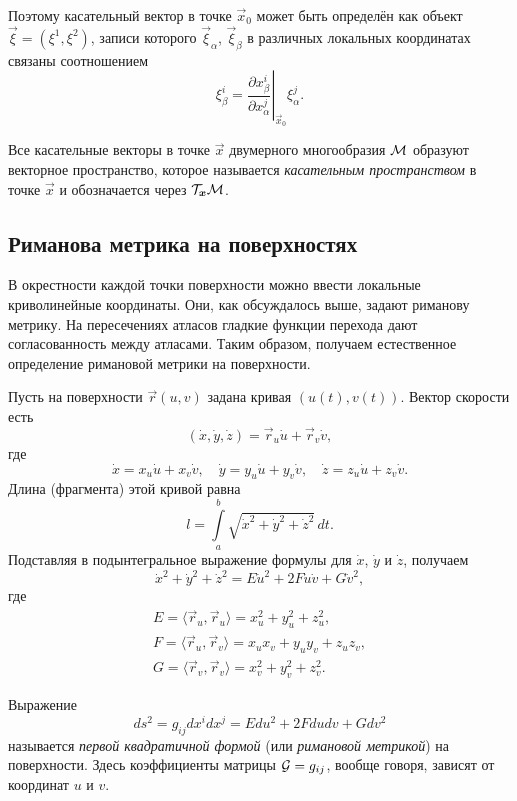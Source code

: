 Поэтому касательный вектор в точке $\vec{x}_0$ может быть определён как объект $\vec{\xi} = (\xi^1, \xi^2)$, записи которого $\vec{\xi}_\alpha$, $\vec{\xi}_\beta$ в различных локальных координатах связаны соотношением
\[
	\xi_\beta^i = \left.\frac{\partial x_\beta^i}{\partial x_\alpha^j}\right|_{\vec{x}_0}\xi^j_\alpha.
\]

\begin{definition}
	Все касательные векторы в точке $\vec{x}$ двумерного многообразия $\mathcal{M}$ образуют векторное пространство, которое называется \textit{касательным пространством} в точке $\vec{x}$ и обозначается через $\mathcal{T}_{\boldsymbol{x}}\mathcal{M}$.
\end{definition}

\subsection{Риманова метрика на поверхностях}

В окрестности каждой точки поверхности можно ввести локальные криволинейные координаты. Они, как обсуждалось выше, задают риманову метрику. На пересечениях атласов гладкие функции перехода дают согласованность между атласами. Таким образом, получаем естественное определение римановой метрики на поверхности.

Пусть на поверхности $\vec{r}(u, v)$ задана кривая $(u(t), v(t))$. Вектор скорости есть
\[
	(\dot{x}, \dot{y}, \dot{z}) = \vec{r}_u\dot{u} + \vec{r}_v\dot{v},
\]
где
\[
	\dot{x} = x_u\dot{u} + x_v\dot{v},\quad
	\dot{y} = y_u\dot{u} + y_v\dot{v},\quad
	\dot{z} = z_u\dot{u} + z_v\dot{v}.
\]
Длина (фрагмента) этой кривой равна
\[
	l = \int\limits_a^b\sqrt{\dot{x}^2 + \dot{y}^2 + \dot{z}^2}\,dt.
\]
Подставляя в подынтегральное выражение формулы для $\dot{x}$, $\dot{y}$ и $\dot{z}$, получаем
\[
	\dot{x}^2 + \dot{y}^2 + \dot{z}^2 = E\dot{u}^2 + 2F\dot{u}\dot{v} + G\dot{v}^2,
\]
где
\begin{gather*}
	E = \langle\vec{r}_u, \vec{r}_u\rangle = x_u^2 + y_u^2 + z_u^2,\\
	F = \langle\vec{r}_u, \vec{r}_v\rangle = x_ux_v + y_uy_v + z_uz_v,\\
	G = \langle\vec{r}_v, \vec{r}_v\rangle = x_v^2 + y_v^2 + z_v^2.
\end{gather*}

\begin{definition}
	Выражение
	\[
		ds^2 = g_{ij}dx^idx^j = Edu^2 + 2Fdudv + Gdv^2
	\]
	называется \textit{первой квадратичной формой} (или \textit{римановой метрикой}) на поверхности. Здесь коэффициенты матрицы $\mathcal{G} = g_{ij}$, вообще говоря, зависят от координат $u$ и $v$.
\end{definition}

